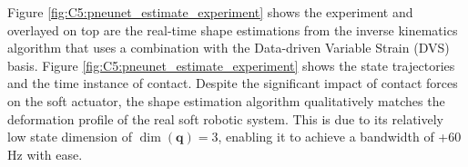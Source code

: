 Figure \ref{fig:C5:pneunet_estimate_experiment} shows the experiment and overlayed on top are the real-time shape estimations from the inverse kinematics algorithm that uses a combination with the Data-driven Variable Strain (DVS) basis. Figure \ref{fig:C5:pneunet_estimate_experiment} shows the state trajectories and the time instance of contact. Despite the significant impact of contact forces on the soft actuator, the shape estimation algorithm qualitatively matches the deformation profile of the real soft robotic system. This is due to its relatively low state dimension of $\dim(\mathbf{q}) = 3$, enabling it to achieve a bandwidth of +60 \si{\hertz} with ease.
